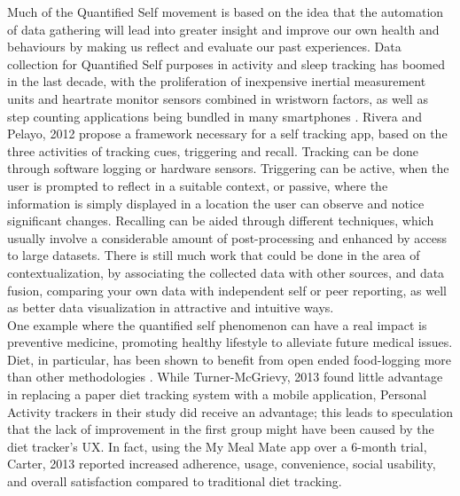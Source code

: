 Much of the Quantified Self movement is based on the idea that the automation of data gathering will lead into greater insight and improve our own health and behaviours by making us reflect and evaluate our past experiences. Data collection for Quantified Self purposes in activity and sleep tracking has boomed in the last decade, with the proliferation of inexpensive inertial measurement units and heartrate monitor sensors combined in wristworn factors, as well as step counting applications being bundled in many smartphones \cite{Crawford2015}.
Rivera and Pelayo, 2012 \cite{Rivera-Pelayo2012} propose a framework necessary for a self tracking app, based on the three activities of tracking cues, triggering and recall.
Tracking can be done through software logging or hardware sensors. Triggering can be active, when the user is prompted to reflect in a suitable context, or passive, where the information is simply displayed in a location the user can observe and notice significant changes. Recalling can be aided through different techniques, which usually involve a considerable amount of post-processing and enhanced by access to large datasets. There is still much work that could be done in the area of contextualization, by associating the collected data with other sources, and data fusion, comparing your own data with independent self or peer reporting, as well as better data visualization in attractive and intuitive ways. \\
One example where the quantified self phenomenon can have a real impact is preventive medicine, promoting healthy lifestyle to alleviate future medical issues. Diet, in particular, has been shown to benefit from open ended food-logging more than other methodologies \cite{Bingham1994}. While Turner-McGrievy, 2013 \cite{Turner-McGrievy2013} found little advantage in replacing a paper diet tracking system with a mobile application, Personal Activity trackers in their study did receive an advantage; this leads to speculation that the lack of improvement in the first group might have been caused by the diet tracker's UX. In fact, using the My Meal Mate app over a 6-month trial, Carter, 2013 \cite{carter2013adherence} reported increased adherence, usage, convenience, social usability, and overall satisfaction compared to traditional diet tracking. \\
